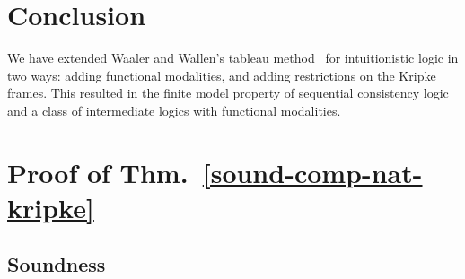 \documentclass[doctor]{iscs-thesis}
\begin{document}
\section{Conclusion}

We have extended Waaler and Wallen's tableau method~\cite{waaler1999tableaux} for intuitionistic
logic in two ways: adding functional modalities, and adding restrictions on the Kripke frames.
This resulted in the finite model property of sequential consistency
logic~\cite{hirailpar} and a class of intermediate logics with
functional modalities.

\section{Proof of Thm.~\ref{sound-comp-nat-kripke}}
\label{app}
\subsection{Soundness}
\end{document}
